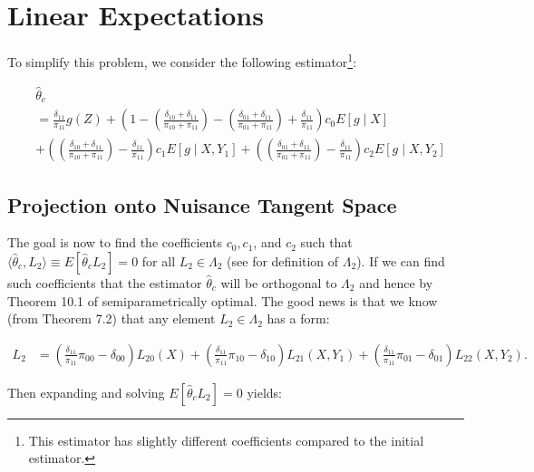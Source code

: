 \documentclass[12pt]{article}
\begin{document}
\section{Linear Expectations}

To simplify this problem, we consider the following estimator\footnote{This
estimator has slightly different coefficients compared to the initial
estimator.}:

\begin{align}
  &\hat \theta_c \\ \nonumber
  &= \frac{\delta_{11}}{\pi_{11}} g(Z) + \left(1 -
    \left(\frac{\delta_{10} + \delta_{11}}{\pi_{10} + \pi_{11}}\right) -
    \left(\frac{\delta_{01} + \delta_{11}}{\pi_{01} + \pi_{11}}\right) + 
  \frac{\delta_{11}}{\pi_{11}}\right) c_0 E[g \mid X] \\ \nonumber
  &+
  \left(\left(\frac{\delta_{10} + \delta_{11}}{\pi_{10} + \pi_{11}}\right) - 
  \frac{\delta_{11}}{\pi_{11}}\right) c_1 E[g \mid X, Y_1] +
  \left(\left(\frac{\delta_{01} + \delta_{11}}{\pi_{01} + \pi_{11}}\right) - 
  \frac{\delta_{11}}{\pi_{11}}\right) c_2 E[g \mid X, Y_2]
\end{align}

\subsection{Projection onto Nuisance Tangent Space}

The goal is now to find the coefficients $c_0, c_1$, and $c_2$ such that 
$\langle \hat \theta_c, L_2\rangle \equiv E[\hat \theta_c L_2] = 0$ for 
all $L_2 \in \Lambda_2$ (see \cite{tsiatis2006semiparametric} for definition 
of $\Lambda_2$). If we can find such coefficients that the estimator $\hat
\theta_c$ will be orthogonal to $\Lambda_2$ and hence by Theorem 10.1 of 
\cite{tsiatis2006semiparametric} semiparametrically optimal. The good news 
is that we know (from Theorem 7.2) that any element $L_2 \in \Lambda_2$ has a
form:

\begin{align}
  L_2 &= 
  \left(\frac{\delta_{11}}{\pi_{11}}\pi_{00} - \delta_{00}\right) L_{20}(X) +
  \left(\frac{\delta_{11}}{\pi_{11}}\pi_{10} - \delta_{10}\right) L_{21}(X, Y_1) +
  \left(\frac{\delta_{11}}{\pi_{11}}\pi_{01} - \delta_{01}\right) L_{22}(X, Y_2).
\end{align}

Then expanding and solving $E[\hat \theta_c L_2] = 0$ yields:
\end{document}

